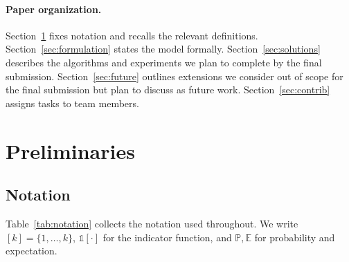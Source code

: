 \documentclass{article}
\theoremstyle{definition}
\theoremstyle{remark}
\newcommand{\E}{\mathbb{E}}
\renewcommand{\Pr}{\mathbb{P}}
\newcommand{\ind}[1]{\mathds{1}\!\left[#1\right]}\newcommand{\Reg}{\mathrm{Reg}}
\begin{document}
\paragraph{Paper organization.} Section~\ref{sec:prelim} fixes notation and recalls the relevant definitions. Section~\ref{sec:formulation} states the model formally. Section~\ref{sec:solutions} describes the algorithms and experiments we plan to complete by the final submission. Section~\ref{sec:future} outlines extensions we consider out of scope for the final submission but plan to discuss as future work. Section~\ref{sec:contrib} assigns tasks to team members.

\section{Preliminaries}
\label{sec:prelim}

\subsection{Notation}

Table~\ref{tab:notation} collects the notation used throughout. We write $[k]=\{1,\dots,k\}$, $\ind{\cdot}$ for the indicator function, and $\Pr,\E$ for probability and expectation.
\end{document}
